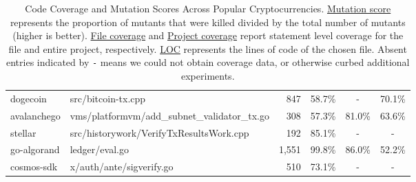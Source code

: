 \begin{table}[ht!]
\begin{tabular}{llrccc}
\cmidrule{2-6}
dogecoin                        & src/bitcoin-tx.cpp                            & 847              & 58.7\%                  & -                       & 70.1\%                   \\
\cmidrule{2-6}
avalanchego                     & vms/platformvm/add\_subnet\_validator\_tx.go  & 308              & 57.3\%                  & 81.0\%                  & 63.6\%                   \\
\cmidrule{2-6}
  stellar                       & src/historywork/VerifyTxResultsWork.cpp       & 192              & 85.1\%                  & -                       & -                        \\
\cmidrule{2-6}
go-algorand                     & ledger/eval.go                                & 1,551            & 99.8\%                  & 86.0\%                  & 52.2\%                   \\
\cmidrule{2-6}
cosmos-sdk                      & x/auth/ante/sigverify.go                      & 510              & 73.1\%                  & -                       &  -                       \\
\bottomrule
\end{tabular}
\caption{Code Coverage and Mutation Scores Across Popular Cryptocurrencies. \underline{Mutation score} represents the proportion of mutants that were killed divided by the total number of mutants (higher is better).
\underline{File coverage} and \underline{Project coverage} report statement level coverage for the file and entire project, respectively. \underline{LOC} represents the lines of code of the chosen file. Absent entries indicated by \texttt{-} means we could not
obtain coverage data, or otherwise curbed additional experiments.
}
\label{tab:comparison}
\end{table}

